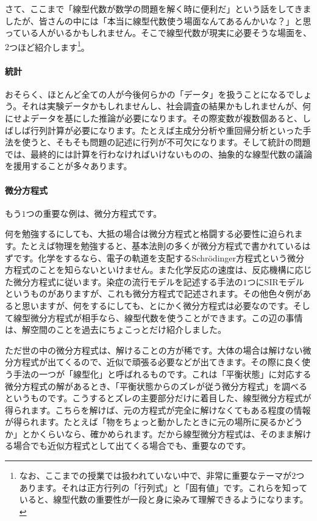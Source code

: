 さて、ここまで「線型代数が数学の問題を解く時に便利だ」という話をしてきましたが、皆さんの中には「本当に線型代数使う場面なんてあるんかいな？」と思っている人がいるかもしれません。そこで線型代数が現実に必要そうな場面を、$2$つほど紹介します\footnote{なお、ここまでの授業では扱われていない中で、非常に重要なテーマが$2$つあります。それは正方行列の「行列式」と「固有値」です。これらを知っていると、線型代数の重要性が一段と身に染みて理解できるようになります。}。

\paragraph{統計}

おそらく、ほとんど全ての人が今後何らかの「データ」を扱うことになるでしょう。それは実験データかもしれませんし、社会調査の結果かもしれませんが、何にせよデータを基にした推論が必要になります。その際変数が複数個あると、しばしば行列計算が必要になります。たとえば主成分分析や重回帰分析といった手法を使うと、そもそも問題の記述に行列が不可欠になります。そして統計の問題では、最終的には計算を行わなければいけないものの、抽象的な線型代数の議論を援用することが多々あります。

\paragraph{微分方程式}

もう$1$つの重要な例は、微分方程式です。

何を勉強するにしても、大抵の場合は微分方程式と格闘する必要性に迫られます。たとえば物理を勉強すると、基本法則の多くが微分方程式で書かれているはずです。化学をするなら、電子の軌道を支配するSchr\"odinger方程式という微分方程式のことを知らないといけません。また化学反応の速度は、反応機構に応じた微分方程式に従います。染症の流行モデルを記述する手法の$1$つにSIRモデルというものがありますが、これも微分方程式で記述されます。その他色々例があると思いますが、何をするにしても、とにかく微分方程式は必要なのです。そして線型微分方程式が相手なら、線型代数を使うことができます。この辺の事情は、解空間のことを過去にちょこっとだけ紹介しました。

ただ世の中の微分方程式は、解けることの方が稀です。大体の場合は解けない微分方程式が出てくるので、近似で頑張る必要などが出てきます。その際に良く使う手法の一つが「線型化」と呼ばれるものです。これは「平衡状態」に対応する微分方程式の解があるとき、「平衡状態からのズレが従う微分方程式」を調べるというものです。こうするとズレの主要部分だけに着目した、線型微分方程式が得られます。こちらを解けば、元の方程式が完全に解けなくてもある程度の情報が得られます。たとえば「物をちょっと動かしたときに元の場所に戻るかどうか」とかくらいなら、確かめられます。だから線型微分方程式は、そのまま解ける場合でも近似方程式として出てくる場合でも、重要なのです。

